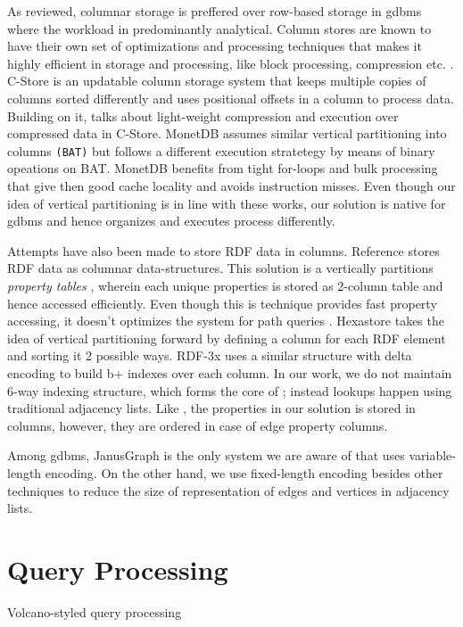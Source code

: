 As reviewed, columnar storage is preffered over row-based storage in \gls{gdbms} where the workload in predominantly analytical. Column stores are known to have their own set of optimizations and processing techniques that makes it highly efficient in storage and processing, like block processing, compression etc. \cite{col-vs-row, design-imp-book}. C-Store \cite{c-store} is an updatable column storage system that keeps multiple copies of columns sorted differently and uses positional offsets in a column to process data. Building on it, \cite{abadi-col-comp, abadi-sparse-col} talks about light-weight compression and execution over compressed data in C-Store. MonetDB \cite{monet-2decades} assumes similar vertical partitioning into columns \texttt{(BAT)} but follows a different execution stratetegy by means of binary opeations on BAT. MonetDB benefits from tight for-loops and bulk processing that give then good cache locality and avoids instruction misses. Even though our idea of vertical partitioning is in line with these works, our solution is native for \gls{gdbms} and hence organizes and executes process differently.

Attempts have also been made to store RDF data in columns. Reference \cite{rdf-vertical} stores RDF data as columnar data-structures. This solution is a vertically partitions \emph{property tables} \cite{pt1, pt2}, wherein each unique properties is stored as 2-column table and hence accessed efficiently. Even though this is technique provides fast property accessing, it doesn't optimizes the system for path queries \cite{rdf-vertical-critic}. Hexastore \cite{hexastore} takes the idea of vertical partitioning forward by defining a column for each RDF element and sorting it 2 possible ways. RDF-3x \cite{rdf-3x} uses a similar structure with delta encoding to build b+ indexes over each column. In our work, we do not maintain 6-way indexing structure, which forms the core of \cite{hexastore, rdf-3x}; instead lookups happen using traditional adjacency lists. Like \cite{rdf-vertical}, the properties in our solution is stored in columns, however, they are ordered in case of edge property columns. 

Among \gls{gdbms}, JanusGraph is the only system we are aware of that uses variable-length encoding. On the other hand, we use fixed-length encoding besides other techniques to reduce the size of representation of edges and vertices in adjacency lists.

\section{Query Processing}

Volcano-styled query processing \cite{volcano} 






